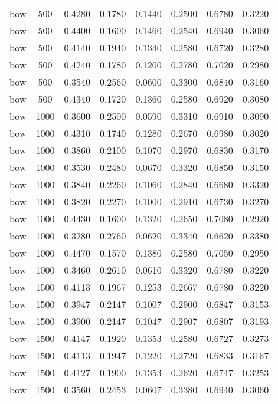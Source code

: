 \begin{scriptsize}
\begin{longtable}{cccccccc}
		bow      & 500  & 0.4280 & 0.1780 & 0.1440 & 0.2500 & 0.6780 & 0.3220 \\
		bow      & 500  & 0.4400 & 0.1600 & 0.1460 & 0.2540 & 0.6940 & 0.3060 \\
		bow      & 500  & 0.4140 & 0.1940 & 0.1340 & 0.2580 & 0.6720 & 0.3280 \\
		bow      & 500  & 0.4240 & 0.1780 & 0.1200 & 0.2780 & 0.7020 & 0.2980 \\
		bow      & 500  & 0.3540 & 0.2560 & 0.0600 & 0.3300 & 0.6840 & 0.3160 \\
		bow      & 500  & 0.4340 & 0.1720 & 0.1360 & 0.2580 & 0.6920 & 0.3080 \\
		bow      & 1000 & 0.3600 & 0.2500 & 0.0590 & 0.3310 & 0.6910 & 0.3090 \\
		bow      & 1000 & 0.4310 & 0.1740 & 0.1280 & 0.2670 & 0.6980 & 0.3020 \\
		bow      & 1000 & 0.3860 & 0.2100 & 0.1070 & 0.2970 & 0.6830 & 0.3170 \\
		bow      & 1000 & 0.3530 & 0.2480 & 0.0670 & 0.3320 & 0.6850 & 0.3150 \\
		bow      & 1000 & 0.3840 & 0.2260 & 0.1060 & 0.2840 & 0.6680 & 0.3320 \\
		bow      & 1000 & 0.3820 & 0.2270 & 0.1000 & 0.2910 & 0.6730 & 0.3270 \\
		bow      & 1000 & 0.4430 & 0.1600 & 0.1320 & 0.2650 & 0.7080 & 0.2920 \\
		bow      & 1000 & 0.3280 & 0.2760 & 0.0620 & 0.3340 & 0.6620 & 0.3380 \\
		bow      & 1000 & 0.4470 & 0.1570 & 0.1380 & 0.2580 & 0.7050 & 0.2950 \\
		bow      & 1000 & 0.3460 & 0.2610 & 0.0610 & 0.3320 & 0.6780 & 0.3220 \\
		bow      & 1500 & 0.4113 & 0.1967 & 0.1253 & 0.2667 & 0.6780 & 0.3220 \\
		bow      & 1500 & 0.3947 & 0.2147 & 0.1007 & 0.2900 & 0.6847 & 0.3153 \\
		bow      & 1500 & 0.3900 & 0.2147 & 0.1047 & 0.2907 & 0.6807 & 0.3193 \\
		bow      & 1500 & 0.4147 & 0.1920 & 0.1353 & 0.2580 & 0.6727 & 0.3273 \\
		bow      & 1500 & 0.4113 & 0.1947 & 0.1220 & 0.2720 & 0.6833 & 0.3167 \\
		bow      & 1500 & 0.4127 & 0.1900 & 0.1353 & 0.2620 & 0.6747 & 0.3253 \\
		bow      & 1500 & 0.3560 & 0.2453 & 0.0607 & 0.3380 & 0.6940 & 0.3060 \\

\end{longtable}
\end{scriptsize}
